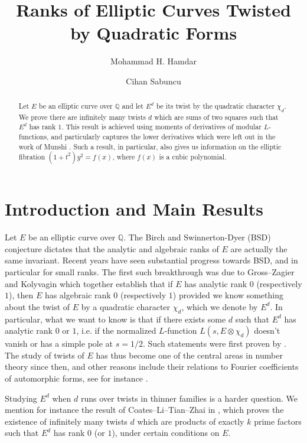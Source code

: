 \documentclass[12pt]{amsart}
\title{Ranks of Elliptic Curves Twisted by Quadratic Forms}
\author{Mohammad H. Hamdar}
\author{Cihan Sabuncu}
\def\Q{\mathbb{Q}}
\def\Q{\mathbb Q}
\def\Q{\mathbb Q}
\begin{document}
\maketitle
\begin{abstract}
    Let $E$ be an elliptic curve over $\Q$ and let $E^d$ be its twist by the quadratic character $\chi_d$. We prove there are infinitely many twists $d$ which are sums of two squares such that $E^d$ has rank $1$. This result is achieved using moments of derivatives of modular $L$-functions, and particularly captures the lower derivatives which were left out in the work of Munshi \cite{Munshi1}. Such a result, in particular, also gives us information on the elliptic fibration $(1+t^2)y^2=f(x)$, where $f(x)$ is a cubic polynomial. 
\end{abstract}
\section{Introduction and Main Results}

Let $E$ be an elliptic curve over $\Q$. The Birch and Swinnerton-Dyer (BSD) conjecture dictates that the analytic and algebraic ranks of $E$ are actually the same invariant. Recent years have seen substantial progress towards BSD, and in particular for small ranks. The first such breakthrough was due to Gross--Zagier \cite{grosszagier} and Kolyvagin \cite{Kolyvagin1} which together establish that if $E$ has analytic rank $0$ (respectively $1$), then $E$ has algebraic rank $0$ (respectively $1$) provided we know something about the  twist of $E$ by a quadratic character $\chi_d$, which we denote by $E^d$. In particular, what we want to know is that if there exists some $d$ such that $E^d$ has analytic rank $0$ or $1$, i.e. if the normalized $L$-function $L(s,E\otimes\chi_d)$ doesn't vanish or has a simple pole at $s=1/2$. Such statements were first proven by \cite{waldspurger, MurtyMurty,BumpFrieHoff}. The study of twists of $E$ has thus become one of the central areas in number theory since then, and other reasons include their relations to Fourier coefficients of automorphic forms, see for instance \cite{wald2, kohnenzagier}.

Studying $E^d$ when $d$ runs over twists in thinner families is a harder question. We mention for instance the result of Coates--Li--Tian--Zhai in \cite{Coates}, which proves the existence of infinitely many twists $d$ which are products of exactly $k$ prime factors such that $E^d$ has rank $0$ (or $1$), under certain conditions on $E$.
\end{document}
